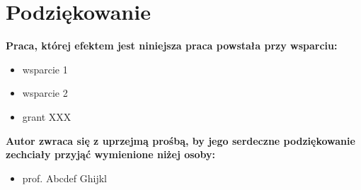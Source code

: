 \chapter*{Podziękowanie}

\textbf{Praca, której efektem jest niniejsza praca powstała przy wsparciu:}

\begin{itemize}
\item wsparcie 1
\item wsparcie 2
\item grant XXX
\end{itemize}

\textbf{Autor zwraca się z uprzejmą prośbą, by jego serdeczne podziękowanie zechciały przyjąć wymienione niżej osoby:}

\begin{itemize}

\item prof. Abcdef Ghijkl 

\end{itemize}

